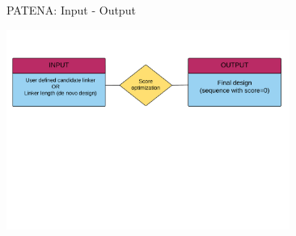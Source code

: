 \documentclass{beamer}
\begin{document}


\begin{frame}{PATENA: Input - Output}

\vspace{24px}
\begin{adjustwidth}{-2.0em}{-2.0em}
\includegraphics[width=350px]{../img/patenaCoarseGrained.png}
 
\end{adjustwidth}


\end{frame}








\end{document}
